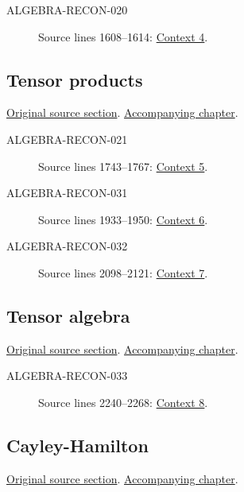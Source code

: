 \begin{description}
\item[ALGEBRA-RECON-020] Source lines 1608--1614: \hyperlink{algebra-context-004}{Context 4}.
\end{description}

\subsection{Tensor products}
\hypertarget{algebra-source-section-tensor-product}{}
\noindent\href{https://github.com/stacks/stacks-project/blob/a04446e57ec1fbc252a871afcec7752fb2807b14/algebra.tex\#L1702}{Original source section}. \href{algebra.pdf\#nameddest=section-tensor-product}{Accompanying chapter}.

\begin{description}
\item[ALGEBRA-RECON-021] Source lines 1743--1767: \hyperlink{algebra-context-005}{Context 5}.
\item[ALGEBRA-RECON-031] Source lines 1933--1950: \hyperlink{algebra-context-006}{Context 6}.
\item[ALGEBRA-RECON-032] Source lines 2098--2121: \hyperlink{algebra-context-007}{Context 7}.
\end{description}

\subsection{Tensor algebra}
\hypertarget{algebra-source-section-tensor-algebra}{}
\noindent\href{https://github.com/stacks/stacks-project/blob/a04446e57ec1fbc252a871afcec7752fb2807b14/algebra.tex\#L2164}{Original source section}. \href{algebra.pdf\#nameddest=section-tensor-algebra}{Accompanying chapter}.

\begin{description}
\item[ALGEBRA-RECON-033] Source lines 2240--2268: \hyperlink{algebra-context-008}{Context 8}.
\end{description}

\subsection{Cayley-Hamilton}
\hypertarget{algebra-source-section-cayley-hamilton}{}
\noindent\href{https://github.com/stacks/stacks-project/blob/a04446e57ec1fbc252a871afcec7752fb2807b14/algebra.tex\#L2806}{Original source section}. \href{algebra.pdf\#nameddest=section-cayley-hamilton}{Accompanying chapter}.

